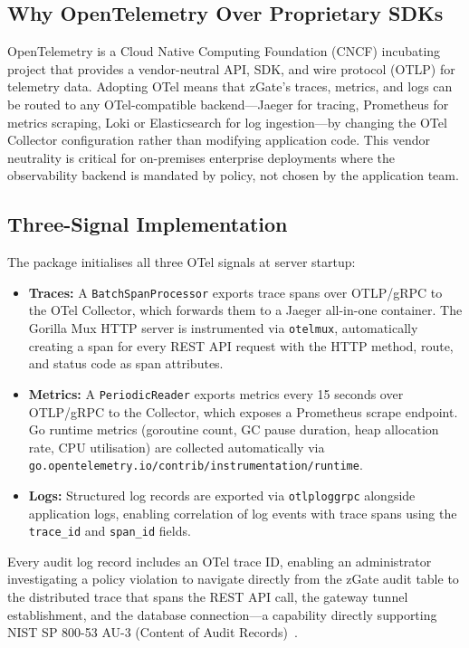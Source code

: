 \subsection{Why OpenTelemetry Over Proprietary SDKs}

OpenTelemetry is a Cloud Native Computing Foundation (CNCF) incubating project that provides a vendor-neutral API, SDK, and wire protocol (OTLP) for telemetry data. Adopting OTel means that zGate's traces, metrics, and logs can be routed to any OTel-compatible backend---Jaeger for tracing, Prometheus for metrics scraping, Loki or Elasticsearch for log ingestion---by changing the OTel Collector configuration rather than modifying application code. This vendor neutrality is critical for on-premises enterprise deployments where the observability backend is mandated by policy, not chosen by the application team.

\subsection{Three-Signal Implementation}

The  package initialises all three OTel signals at server startup:

\begin{itemize}
    \item \textbf{Traces:} A \texttt{BatchSpanProcessor} exports trace spans over OTLP/gRPC to the OTel Collector, which forwards them to a Jaeger all-in-one container. The Gorilla Mux HTTP server is instrumented via \texttt{otelmux}, automatically creating a span for every REST API request with the HTTP method, route, and status code as span attributes.
    \item \textbf{Metrics:} A \texttt{PeriodicReader} exports metrics every 15 seconds over OTLP/gRPC to the Collector, which exposes a Prometheus scrape endpoint. Go runtime metrics (goroutine count, GC pause duration, heap allocation rate, CPU utilisation) are collected automatically via \texttt{go.opentelemetry.io/contrib/instrumentation/runtime}.
    \item \textbf{Logs:} Structured log records are exported via \texttt{otlploggrpc} alongside application logs, enabling correlation of log events with trace spans using the \texttt{trace\_id} and \texttt{span\_id} fields.
\end{itemize}

Every audit log record includes an OTel trace ID, enabling an administrator investigating a policy violation to navigate directly from the zGate audit table to the distributed trace that spans the REST API call, the gateway tunnel establishment, and the database connection---a capability directly supporting NIST SP 800-53 AU-3 (Content of Audit Records)~\cite{nist-controls}.

